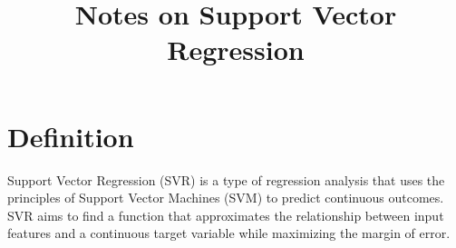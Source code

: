 \documentclass[conference]{IEEEtran}
\title{Notes on Support Vector Regression}
\author{
\IEEEauthorblockN{Luis Mendez}
}
\begin{document}
\maketitle

\section*{Definition}
Support Vector Regression (SVR) is a type of regression analysis that uses the principles of Support Vector Machines (SVM) to predict continuous outcomes. SVR aims to find a function that approximates the relationship between input features and a continuous target variable while maximizing the margin of error.
\end{document}
